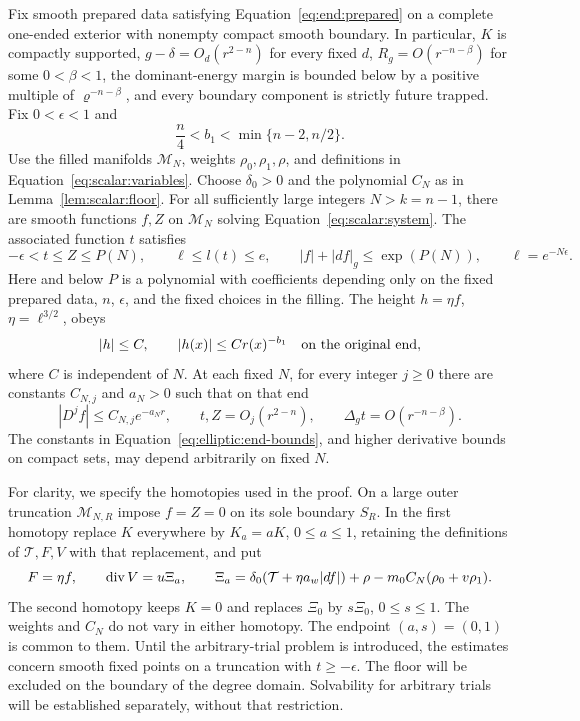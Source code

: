 \begin{theorem}\label{thm:elliptic:filled}
Fix smooth prepared data satisfying Equation~\eqref{eq:end:prepared}
on a complete one-ended exterior with nonempty compact smooth boundary.
In particular, $K$ is compactly supported,
$g-\delta=O_d(r^{2-n})$ for every fixed $d$,
$R_g=O(r^{-n-\beta})$ for some $0<\beta<1$,
the dominant-energy margin is bounded below by a positive multiple of
$\varrho^{-n-\beta}$, and every boundary component is strictly future
trapped.  Fix $0<\epsilon<1$ and
\[
 \frac n4<b_1<\min\{n-2,n/2\}.
\]
Use the filled manifolds $\mathcal M_N$, weights $\rho_0,\rho_1,\rho$,
and definitions in Equation~\eqref{eq:scalar:variables}.  Choose
$\delta_0>0$ and the polynomial $C_N$ as in
Lemma~\ref{lem:scalar:floor}.  For all sufficiently large integers
$N>k=n-1$, there are smooth functions $f,Z$ on $\mathcal M_N$
solving Equation~\eqref{eq:scalar:system}.  The associated function $t$
satisfies
\begin{equation}\label{eq:elliptic:polynomial-bounds}
 -\epsilon<t\le Z\le P(N),\qquad
 \ell\le l(t)\le e,\qquad
 |f|+|df|_g\le \exp(P(N)),\qquad \ell=e^{-N\epsilon}.
\end{equation}
Here and below $P$ is a polynomial with coefficients depending only on
the fixed prepared data, $n$, $\epsilon$, and the fixed choices in the
filling.  The height $h=\eta f$, $\eta=\ell^{3/2}$, obeys
\begin{equation}\label{eq:elliptic:height-bound}
 |h|\le C,\qquad |h(x)|\le C r(x)^{-b_1}
 \quad\hbox{on the original end},
\end{equation}
where $C$ is independent of $N$.  At each fixed $N$, for every integer
$j\ge0$ there are constants $C_{N,j}$ and $a_N>0$ such that on that end
\begin{equation}\label{eq:elliptic:end-bounds}
 |D^j f|\le C_{N,j}e^{-a_Nr},\qquad
 t,Z=O_j(r^{2-n}),\qquad
 \Delta_g t=O(r^{-n-\beta}).
\end{equation}
The constants in Equation~\eqref{eq:elliptic:end-bounds}, and higher
derivative bounds on compact sets, may depend arbitrarily on fixed $N$.
\end{theorem}

For clarity, we specify the homotopies used in the proof.  On a large
outer truncation $\mathcal M_{N,R}$ impose $f=Z=0$ on its sole boundary
$S_R$.  In the first homotopy replace $K$ everywhere by $K_a=aK$,
$0\le a\le1$, retaining the definitions of $\mathcal T,F,V$ with that
replacement, and put
\begin{equation}\label{eq:elliptic:homotopies}
 F=\eta f,\qquad
 \operatorname{div} V=u\Xi_a,\qquad
 \Xi_a=\delta_0(\mathcal T+\eta a_w|df|)
       +\rho-m_0C_N(\rho_0+v\rho_1).
\end{equation}
The second homotopy keeps $K=0$ and replaces $\Xi_0$ by $s\Xi_0$,
$0\le s\le1$.  The weights and $C_N$ do not vary in either homotopy.
The endpoint $(a,s)=(0,1)$ is common to them.  Until the arbitrary-trial problem is introduced, the estimates concern
smooth fixed points on a truncation with $t\ge-\epsilon$.
The floor will be excluded on the boundary of the degree domain.
Solvability for arbitrary trials will be established separately, without
that restriction.

